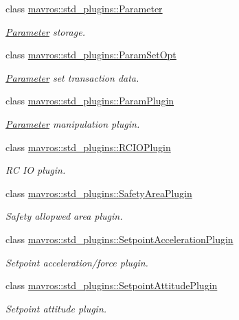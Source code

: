 \begin{DoxyCompactItemize}
class \mbox{\hyperlink{classmavros_1_1std__plugins_1_1Parameter}{mavros\+::std\+\_\+plugins\+::\+Parameter}}
\begin{DoxyCompactList}\small\item\em \mbox{\hyperlink{classmavros_1_1std__plugins_1_1Parameter}{Parameter}} storage. \end{DoxyCompactList}\item 
class \mbox{\hyperlink{classmavros_1_1std__plugins_1_1ParamSetOpt}{mavros\+::std\+\_\+plugins\+::\+Param\+Set\+Opt}}
\begin{DoxyCompactList}\small\item\em \mbox{\hyperlink{classmavros_1_1std__plugins_1_1Parameter}{Parameter}} set transaction data. \end{DoxyCompactList}\item 
class \mbox{\hyperlink{classmavros_1_1std__plugins_1_1ParamPlugin}{mavros\+::std\+\_\+plugins\+::\+Param\+Plugin}}
\begin{DoxyCompactList}\small\item\em \mbox{\hyperlink{classmavros_1_1std__plugins_1_1Parameter}{Parameter}} manipulation plugin. \end{DoxyCompactList}\item 
class \mbox{\hyperlink{classmavros_1_1std__plugins_1_1RCIOPlugin}{mavros\+::std\+\_\+plugins\+::\+R\+C\+I\+O\+Plugin}}
\begin{DoxyCompactList}\small\item\em RC IO plugin. \end{DoxyCompactList}\item 
class \mbox{\hyperlink{classmavros_1_1std__plugins_1_1SafetyAreaPlugin}{mavros\+::std\+\_\+plugins\+::\+Safety\+Area\+Plugin}}
\begin{DoxyCompactList}\small\item\em Safety allopwed area plugin. \end{DoxyCompactList}\item 
class \mbox{\hyperlink{classmavros_1_1std__plugins_1_1SetpointAccelerationPlugin}{mavros\+::std\+\_\+plugins\+::\+Setpoint\+Acceleration\+Plugin}}
\begin{DoxyCompactList}\small\item\em Setpoint acceleration/force plugin. \end{DoxyCompactList}\item 
class \mbox{\hyperlink{classmavros_1_1std__plugins_1_1SetpointAttitudePlugin}{mavros\+::std\+\_\+plugins\+::\+Setpoint\+Attitude\+Plugin}}
\begin{DoxyCompactList}\small\item\em Setpoint attitude plugin. \end{DoxyCompactList}\item 

\end{DoxyCompactItemize}
